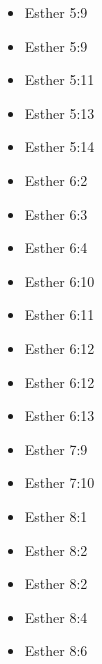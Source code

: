 \documentclass[14pt]{article}
\begin{document}
\begin{multicols}{2}
\begin{itemize}
							\item Esther 5:9
							
							\item Esther 5:9
							
							\item Esther 5:11
							
							\item Esther 5:13
							
							\item Esther 5:14
							
							\item Esther 6:2
							
							\item Esther 6:3
							
							\item Esther 6:4
							
							\item Esther 6:10
							
							\item Esther 6:11
							
							\item Esther 6:12
							
							\item Esther 6:12
							
							\item Esther 6:13
							
							\item Esther 7:9
							
							\item Esther 7:10
							
							\item Esther 8:1
							
							\item Esther 8:2
							
							\item Esther 8:2
							
							\item Esther 8:4
							
							\item Esther 8:6
							

\end{itemize}
\end{multicols}
\end{document}
